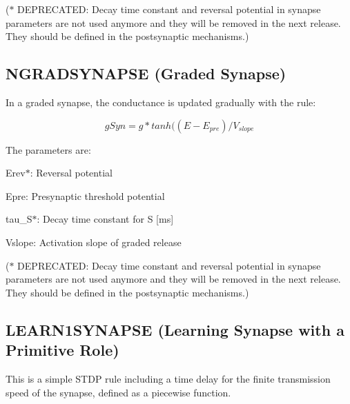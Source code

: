($\ast$ D\+E\+P\+R\+E\+C\+A\+T\+E\+D\+: Decay time constant and reversal potential in synapse parameters are not used anymore and they will be removed in the next release. They should be defined in the postsynaptic mechanisms.)\hypertarget{sect3_sect32}{}\subsection{N\+G\+R\+A\+D\+S\+Y\+N\+A\+P\+S\+E (\+Graded Synapse)}\label{sect3_sect32}
In a graded synapse, the conductance is updated gradually with the rule\+:

\[ gSyn= g * tanh((E - E_{pre}) / V_{slope} \]

The parameters are\+:
\begin{DoxyItemize}
\item {\ttfamily Erev$\ast$}\+: Reversal potential
\item {\ttfamily Epre\+:} Presynaptic threshold potential
\item {\ttfamily tau\+\_\+\+S$\ast$}\+: Decay time constant for S \mbox{[}ms\mbox{]}
\item {\ttfamily Vslope\+:} Activation slope of graded release
\end{DoxyItemize}

($\ast$ D\+E\+P\+R\+E\+C\+A\+T\+E\+D\+: Decay time constant and reversal potential in synapse parameters are not used anymore and they will be removed in the next release. They should be defined in the postsynaptic mechanisms.)\hypertarget{sect3_sect33}{}\subsection{L\+E\+A\+R\+N1\+S\+Y\+N\+A\+P\+S\+E (\+Learning Synapse with a Primitive Role)}\label{sect3_sect33}
This is a simple S\+T\+D\+P rule including a time delay for the finite transmission speed of the synapse, defined as a piecewise function.

